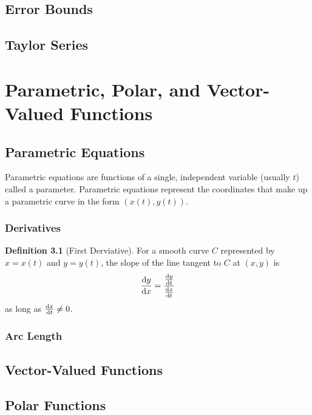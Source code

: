 \documentclass[letterpaper]{report}
\theoremstyle{definition}
\newtheorem{definition}{Definition}
\begin{document}
\section{Error Bounds}

\section{Taylor Series}

\chapter{Parametric, Polar, and Vector-Valued Functions}

\section{Parametric Equations}
Parametric equations are functions of a single, independent variable 
(usually $t$) called a parameter.
Parametric equations represent the coordinates that make up a parametric curve
in the form $(x(t), y(t))$.

\subsection{Derivatives}
\begin{definition}[First Derviative]
    For a smooth curve $C$ represented by $x = x(t)$ and $y = y(t)$,
    the slope of the line tangent to $C$ at $(x,y)$ is
\[ \dv{y}{x} = \frac{\dv{y}{t}}{\dv{x}{t}} \]
as long as $\dv{x}{t} \neq 0$. 
\end{definition}

\subsection{Arc Length}

\section{Vector-Valued Functions}

\section{Polar Functions}
\end{document}
